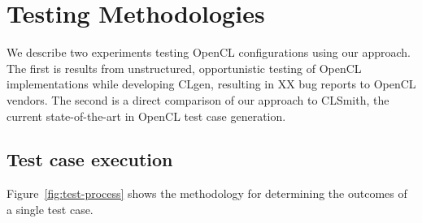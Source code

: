 \section{Testing Methodologies}\label{sec:methodology}

We describe two experiments testing OpenCL configurations using our approach. The first is results from unstructured, opportunistic testing of OpenCL implementations while developing CLgen, resulting in XX bug reports to OpenCL vendors. The second is a direct comparison of our approach to CLSmith, the current state-of-the-art in OpenCL test case generation.

% 

%
%

\subsection{Test case execution}



Figure~\ref{fig:test-process} shows the methodology for determining the outcomes of a single test case.

